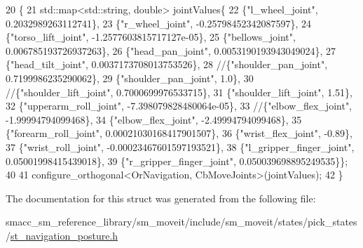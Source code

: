\begin{DoxyCode}
20     \{
21        std::map<std::string, double> jointValues\{
22             \{\textcolor{stringliteral}{"l\_wheel\_joint"}, 0.2032989263112741\},
23             \{\textcolor{stringliteral}{"r\_wheel\_joint"}, -0.25798452342087597\},
24             \{\textcolor{stringliteral}{"torso\_lift\_joint"}, -1.2577603815717127e-05\},
25             \{\textcolor{stringliteral}{"bellows\_joint"}, 0.006785193726937263\},
26             \{\textcolor{stringliteral}{"head\_pan\_joint"}, 0.0053190193943049024\},
27             \{\textcolor{stringliteral}{"head\_tilt\_joint"}, 0.0037173708013753526\},
28             \textcolor{comment}{//\{"shoulder\_pan\_joint", 0.7199986235290062\},}
29             \{\textcolor{stringliteral}{"shoulder\_pan\_joint"}, 1.0\},
30             \textcolor{comment}{//\{"shoulder\_lift\_joint", 0.7000699976533715\},}
31             \{\textcolor{stringliteral}{"shoulder\_lift\_joint"}, 1.51\},
32             \{\textcolor{stringliteral}{"upperarm\_roll\_joint"}, -7.398079828480064e-05\},
33             \textcolor{comment}{//\{"elbow\_flex\_joint", -1.99994794099468\},}
34             \{\textcolor{stringliteral}{"elbow\_flex\_joint"}, -2.49994794099468\},
35             \{\textcolor{stringliteral}{"forearm\_roll\_joint"}, 0.00021030168417901507\},
36             \{\textcolor{stringliteral}{"wrist\_flex\_joint"}, -0.89\},
37             \{\textcolor{stringliteral}{"wrist\_roll\_joint"}, -0.00023467601597193521\},
38             \{\textcolor{stringliteral}{"l\_gripper\_finger\_joint"}, 0.05001998415439018\},
39             \{\textcolor{stringliteral}{"r\_gripper\_finger\_joint"}, 0.050039698895249535\}\};
40 
41         configure\_orthogonal<OrNavigation, CbMoveJoints>(jointValues);
42     \}
\end{DoxyCode}


The documentation for this struct was generated from the following file\+:\begin{DoxyCompactItemize}
\item 
smacc\+\_\+sm\+\_\+reference\+\_\+library/sm\+\_\+moveit/include/sm\+\_\+moveit/states/pick\+\_\+states/\hyperlink{st__navigation__posture_8h}{st\+\_\+navigation\+\_\+posture.\+h}\end{DoxyCompactItemize}
